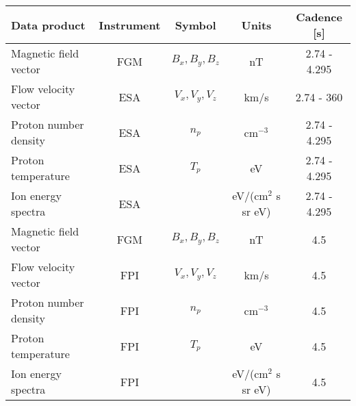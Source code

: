 \begin{tabular}{lcccc}
\hline
Data product          & Instrument & Symbol           & Units        & Cadence [s] \\
\hline
Magnetic field vector & FGM        & $B_x, B_y, B_z$  & nT                   & 2.74 - 4.295 \\
Flow velocity vector  & ESA        & $V_x, V_y, V_z$  & km/s                 & 2.74 - 360 \\
Proton number density & ESA        & $n_p$            & cm$^{-3}$            & 2.74 - 4.295 \\
Proton temperature    & ESA        & $T_p$            & eV                   & 2.74 - 4.295 \\
Ion energy spectra    & ESA        &                  & eV/(cm$^2$ s sr eV)  & 2.74 - 4.295 \\
\hline
Magnetic field vector & FGM        & $B_x, B_y, B_z$  & nT                   & 4.5 \\
Flow velocity vector  & FPI        & $V_x, V_y, V_z$  & km/s                 & 4.5 \\
Proton number density & FPI        & $n_p$            & cm$^{-3}$            & 4.5 \\
Proton temperature    & FPI        & $T_p$            & eV                   & 4.5 \\
Ion energy spectra    & FPI        &                  & eV/(cm$^2$ s sr eV)  & 4.5 \\
\hline
\end{tabular}